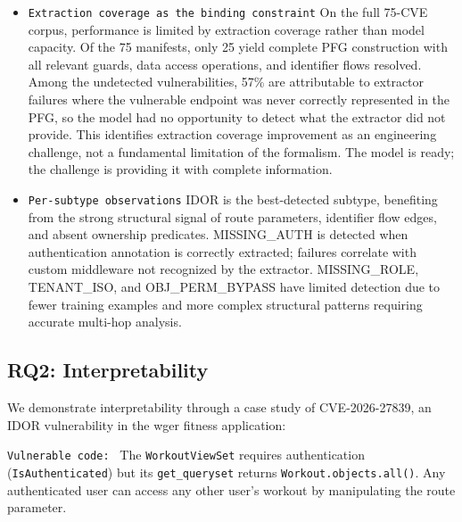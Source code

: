 \begin{itemize}
F1 = 0.727 with \emph{all} 4 known vulnerabilities detected (100\% recall).
The 3 false positives in wger represent a per-endpoint rate of 0.56\%
(3/531 endpoints), an acceptable triage burden. This result demonstrates
that the PFG approach detects real-world authorization vulnerabilities when
the extractor produces complete graphs: the detection model is validated on
production code.

\item  \texttt{Extraction coverage as the binding constraint}
On the full 75-CVE corpus, performance is limited by extraction coverage
rather than model capacity. Of the 75 manifests, only 25 yield complete
PFG construction with all relevant guards, data access operations, and
identifier flows resolved. Among the undetected vulnerabilities, 57\% are
attributable to extractor failures where the vulnerable endpoint was never
correctly represented in the PFG, so the model had no opportunity to detect
what the extractor did not provide. This identifies extraction coverage
improvement as an engineering challenge, not a fundamental limitation of the
formalism. The model is ready; the challenge is providing it with complete
information.

\item  \texttt{Per-subtype observations}
IDOR is the best-detected subtype, benefiting from the strong structural
signal of route parameters, identifier flow edges, and absent ownership
predicates. MISSING\_AUTH is detected when authentication annotation is
correctly extracted; failures correlate with custom middleware not recognized
by the extractor. MISSING\_ROLE, TENANT\_ISO, and OBJ\_PERM\_BYPASS have
limited detection due to fewer training examples and more complex structural
patterns requiring accurate multi-hop analysis.


\end{itemize}

\subsection{RQ2: Interpretability}
\label{sec:det-rq2}

We demonstrate interpretability through a case study of CVE-2026-27839, an
IDOR vulnerability in the wger fitness application:

\texttt{Vulnerable code: } The \texttt{WorkoutViewSet} requires authentication
(\texttt{IsAuthenticated}) but its \texttt{get\_queryset} returns
\texttt{Workout.objects.all()}. Any authenticated user can access any other
user's workout by manipulating the route parameter.

